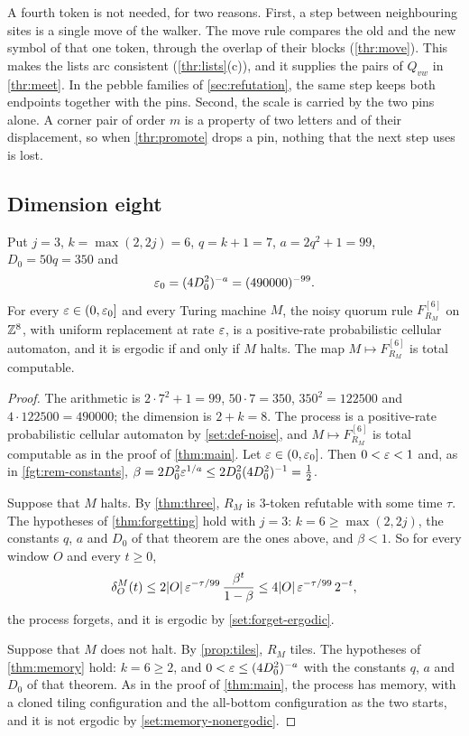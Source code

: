 A fourth token is not needed, for two reasons. First, a step between neighbouring sites is a single move of the walker. The move rule compares the old and the new symbol of that one token, through the overlap of their blocks (\cref{thr:move}). This makes the lists arc consistent (\cref{thr:lists}(c)), and it supplies the pairs of $Q_{vw}$ in \cref{thr:meet}. In the pebble families of \cref{sec:refutation}, the same step keeps both endpoints together with the pins. Second, the scale is carried by the two pins alone. A corner pair of order $m$ is a property of two letters and of their displacement, so when \cref{thr:promote} drops a pin, nothing that the next step uses is lost.

\begin{samepage}
\subsection{Dimension eight}\label{thr:sec-eight}

\begin{corollary}\label{cor:eight}
Put $j=3$, $k=\max(2,2j)=6$, $q=k+1=7$, $a=2q^2+1=99$, $D_0=50q=350$ and
\[
\varepsilon_0=(4D_0^2)^{-a}=(490000)^{-99}.
\]
For every $\varepsilon\in(0,\varepsilon_0]$ and every Turing machine $M$, the noisy quorum rule $F^{[6]}_{R_M}$ on $\mathbb{Z}^{8}$, with uniform replacement at rate $\varepsilon$, is a positive-rate probabilistic cellular automaton, and it is ergodic if and only if $M$ halts. The map $M\mapsto F^{[6]}_{R_M}$ is total computable.
\end{corollary}
\end{samepage}

\begin{proof}
The arithmetic is $2\cdot7^2+1=99$, $50\cdot7=350$, $350^2=122500$ and $4\cdot122500=490000$; the dimension is $2+k=8$. The process is a positive-rate probabilistic cellular automaton by \cref{set:def-noise}, and $M\mapsto F^{[6]}_{R_M}$ is total computable as in the proof of \cref{thm:main}. Let $\varepsilon\in(0,\varepsilon_0]$. Then $0<\varepsilon<1$ and, as in \cref{fgt:rem-constants}, $\beta=2D_0^2\varepsilon^{1/a}\le2D_0^2(4D_0^2)^{-1}=\frac12$.

Suppose that $M$ halts. By \cref{thm:three}, $R_M$ is $3$-token refutable with some time $\tau$. The hypotheses of \cref{thm:forgetting} hold with $j=3$: $k=6\ge\max(2,2j)$, the constants $q$, $a$ and $D_0$ of that theorem are the ones above, and $\beta<1$. So for every window $O$ and every $t\ge0$,
\[
\delta^M_O(t)\le2|O|\,\varepsilon^{-\tau/99}\,\frac{\beta^t}{1-\beta}\le4|O|\,\varepsilon^{-\tau/99}\,2^{-t},
\]
the process forgets, and it is ergodic by \cref{set:forget-ergodic}.

Suppose that $M$ does not halt. By \cref{prop:tiles}, $R_M$ tiles. The hypotheses of \cref{thm:memory} hold: $k=6\ge2$, and $0<\varepsilon\le(4D_0^2)^{-a}$ with the constants $q$, $a$ and $D_0$ of that theorem. As in the proof of \cref{thm:main}, the process has memory, with a cloned tiling configuration and the all-bottom configuration as the two starts, and it is not ergodic by \cref{set:memory-nonergodic}.
\end{proof}

